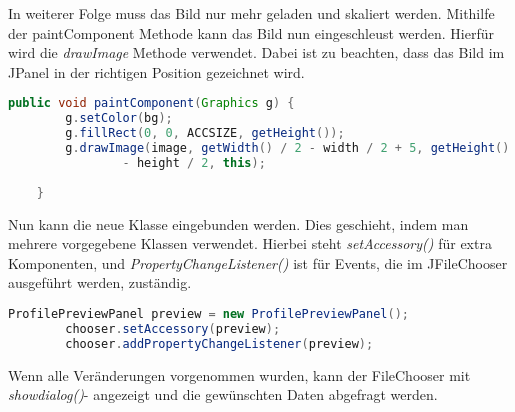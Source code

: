 In weiterer Folge muss das Bild nur mehr geladen und skaliert werden. Mithilfe der paintComponent Methode kann das Bild nun eingeschleust werden. Hierfür wird die \textit{drawImage} Methode verwendet. Dabei ist zu beachten, dass das Bild im JPanel in der richtigen Position gezeichnet wird.
\begin{lstlisting}[language=JAVA]
public void paintComponent(Graphics g) {
		g.setColor(bg);
		g.fillRect(0, 0, ACCSIZE, getHeight());
		g.drawImage(image, getWidth() / 2 - width / 2 + 5, getHeight() / 2
				- height / 2, this);
		
	}
\end{lstlisting}

Nun kann die neue Klasse eingebunden werden. Dies geschieht, indem man mehrere vorgegebene Klassen verwendet. Hierbei steht \textit{setAccessory()} für extra Komponenten, und \textit{PropertyChangeListener()} ist für Events, die im JFileChooser ausgeführt werden, zuständig.

\begin{lstlisting}[language=JAVA]
		ProfilePreviewPanel preview = new ProfilePreviewPanel();
		chooser.setAccessory(preview);
		chooser.addPropertyChangeListener(preview);
\end{lstlisting}

Wenn alle Veränderungen vorgenommen wurden, kann der FileChooser mit \textit{showdialog()}- angezeigt und die gewünschten Daten abgefragt werden.